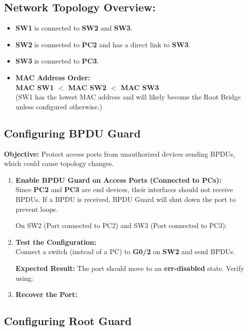 \documentclass[a4paper]{book}
\begin{document}
\subsection*{Network Topology Overview:}

\begin{itemize}
    \item \textbf{SW1} is connected to \textbf{SW2} and \textbf{SW3}.
    \item \textbf{SW2} is connected to \textbf{PC2} and has a direct link to \textbf{SW3}.
    \item \textbf{SW3} is connected to \textbf{PC3}.
    \item \textbf{MAC Address Order:} \\
    \textbf{MAC SW1 $<$ MAC SW2 $<$ MAC SW3} \\
    (SW1 has the lowest MAC address and will likely become the Root Bridge unless configured otherwise.)
\end{itemize}

\subsection*{Configuring BPDU Guard}

\textbf{Objective:} Protect access ports from unauthorized devices sending BPDUs, which could cause topology changes.

\begin{enumerate} 
    \item \textbf{Enable BPDU Guard on Access Ports (Connected to PCs):} \\
    Since \textbf{PC2} and \textbf{PC3} are end devices, their interfaces should not receive BPDUs. If a BPDU is received, BPDU Guard will shut down the port to prevent loops.

    On SW2 (Port connected to PC2) and SW3 (Port connected to PC3):


    \item \textbf{Test the Configuration:} \\
    Connect a switch (instead of a PC) to \textbf{G0/2} on \textbf{SW2} and send BPDUs.

    \textbf{Expected Result:} The port should move to an \textbf{err-disabled} state. Verify using:


    \item \textbf{Recover the Port:}

\end{enumerate}

\subsection*{Configuring Root Guard}
\end{document}
